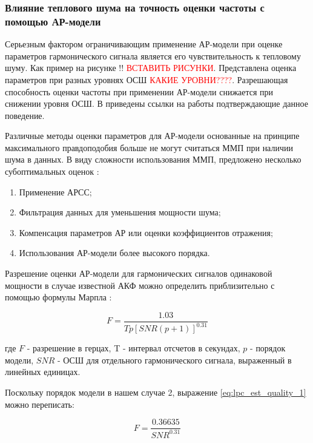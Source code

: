 \subsubsection{Влияние теплового шума на точность оценки частоты с помощью АР-модели}
Серьезным фактором ограничивающим применение АР-модели при оценке параметров гармонического сигнала является
его чувствительность к тепловому шуму. Как пример на рисунке !! \textcolor{red}{ВСТАВИТЬ РИСУНКИ}. Представлена
оценка параметров при разных уровнях ОСШ \textcolor{red}{КАКИЕ УРОВНИ????}. Разрешающая способность оценки
частоты при применении АР-модели снижается при снижении уровня ОСШ.
В \cite{kay_spectral_estimation} приведены ссылки на работы
\cite{lacoss_spectral_est, chen_spectral_est, marple_1977} подтверждающие данное поведение.

Различные методы оценки параметров для АР-модели основанные на принципе максимального правдоподобия больше не
могут считаться ММП при наличии шума в данных. В виду сложности использования ММП, предложено несколько 
субоптимальных оценок \cite{marpl_book, kay_spectral_estimation}:
\begin{enumerate}
	\item Применение АРСС;
	\item Фильтрация данных для уменьшения мощности шума;
	\item Компенсация параметров АР или оценки коэффициентов отражения;
	\item Использования АР-модели более высокого порядка.
\end{enumerate}

Разрешение оценки АР-модели для гармонических сигналов одинаковой мощности в случае известной АКФ
можно определить приблизительно с помощью формулы Марпла \cite{marpl_book, kay_spectral_estimation}:
\begin{center}
\begin{equation}
	\label{eq:lpc_est_quality_1}
	F = \frac{1.03}{Tp[SNR(p+1)]^{0.31}}
\end{equation}
\end{center}

где ${F}$ - разрешение в герцах, T - интервал отсчетов в секундах, ${p}$ - порядок модели,
${SNR}$ - ОСШ для отдельного гармонического сигнала, выраженный в линейных единицах.

Поскольку порядок модели в нашем случае 2, выражение \ref{eq:lpc_est_quality_1} можно переписать:
\begin{center}
\begin{equation}
	\label{eq:lpc_est_quality_2}
	F = \frac{0.36635}{SNR^{0.31}}
\end{equation}
\end{center}

